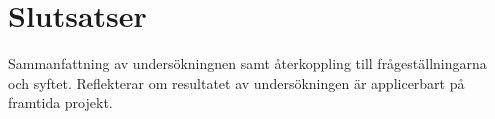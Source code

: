 \section{Slutsatser}
\label{sec:alexander-conclusion}

Sammanfattning av undersökningnen samt återkoppling till frågeställningarna och syftet. Reflekterar om resultatet av undersökningen är applicerbart på framtida projekt.
